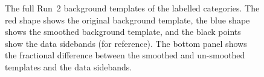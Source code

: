 \begin{figure}
\begin{center}
\caption{The full Run~2 background templates of the labelled categories. The red shape shows the original background template, the blue shape shows the smoothed background template, and the black points show the data sidebands (for reference). The bottom panel shows the fractional difference between the smoothed and un-smoothed templates and the data sidebands. }
 \label{fig:gpr_coupcat_9}
 \end{center}
\end{figure}

